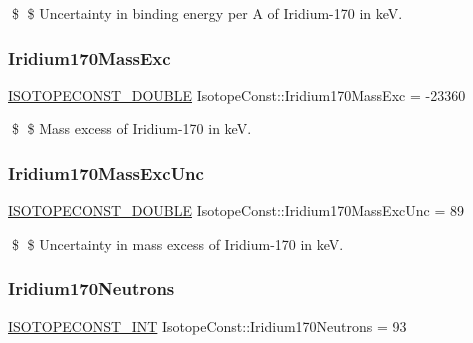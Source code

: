 \$ \$ Uncertainty in binding energy per A of Iridium-\/170 in keV. \mbox{\label{group___isotope_const-_iridium-_ir170_ga145c9e0ebbd25309438d77a4a4286878}} 
\subsubsection{\texorpdfstring{Iridium170\+Mass\+Exc}{Iridium170MassExc}}
{\footnotesize\ttfamily \mbox{\hyperlink{group___isotope_const-_macros_ga8f45a7272ce02c0b4c65c44636ed719a}{I\+S\+O\+T\+O\+P\+E\+C\+O\+N\+S\+T\+\_\+\+D\+O\+U\+B\+LE}} Isotope\+Const\+::\+Iridium170\+Mass\+Exc = -\/23360}

\$ \$ Mass excess of Iridium-\/170 in keV. \mbox{\label{group___isotope_const-_iridium-_ir170_ga55db48c032542c7a7244fbaae50df8fa}} 
\subsubsection{\texorpdfstring{Iridium170\+Mass\+Exc\+Unc}{Iridium170MassExcUnc}}
{\footnotesize\ttfamily \mbox{\hyperlink{group___isotope_const-_macros_ga8f45a7272ce02c0b4c65c44636ed719a}{I\+S\+O\+T\+O\+P\+E\+C\+O\+N\+S\+T\+\_\+\+D\+O\+U\+B\+LE}} Isotope\+Const\+::\+Iridium170\+Mass\+Exc\+Unc = 89}

\$ \$ Uncertainty in mass excess of Iridium-\/170 in keV. \mbox{\label{group___isotope_const-_iridium-_ir170_gaacc0ac3d38f77c7990715473e9c07890}} 
\subsubsection{\texorpdfstring{Iridium170\+Neutrons}{Iridium170Neutrons}}
{\footnotesize\ttfamily \mbox{\hyperlink{group___isotope_const-_macros_ga5f18360b3e99483a35c32d789e62621c}{I\+S\+O\+T\+O\+P\+E\+C\+O\+N\+S\+T\+\_\+\+I\+NT}} Isotope\+Const\+::\+Iridium170\+Neutrons = 93}

